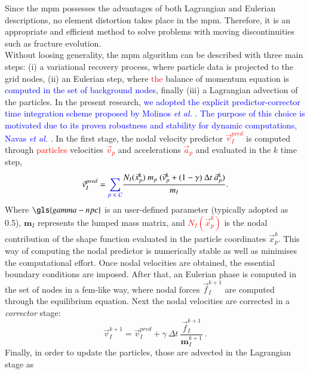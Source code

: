 \documentclass[preprint,12pt,a4paper]{elsarticle}
\newcommand{\tens}[1]{
  \ensuremath{\mathbf{{#1}}}
}
\begin{document}
Since the \acrshort{mpm} possesses the advantages of both Lagrangian and Eulerian descriptions, no  element distortion takes place in the \acrshort{mpm}. Therefore, it is an appropriate and efficient method
to solve problems with moving discontinuities such as fracture evolution.\\
Without loosing generality, the \acrshort{mpm} algorithm
can be described with three main steps: (i) a variational recovery
process, where particle data is projected to the grid nodes, (ii) an
Eulerian step, where \textcolor{red}{the} balance of momentum equation is \textcolor{blue}{computed in the set of background nodes}, finally
(iii) a Lagrangian advection of the particles. In the present research,
\textcolor{blue}{we adopted the explicit predictor-corrector time integration scheme proposed by Molinos {\it et al.} \cite{Molinos2020}. The purpose of this choice is motivated due to its proven robustness and stability for dynamic computations, Navas {\it et al.} \cite{Navas2018a}}. In the first stage, the nodal velocity predictor \textcolor{red}{$ \vec{v}_{I}^{pred}$} is computed through
\textcolor{red}{particles} velocities \textcolor{red}{$\vec{v}_p$} and accelerations \textcolor{red}{$\vec{a}_p$} and evaluated
in the $k$ time step,
\begin{equation}
 \label{eq:Predictor-velocity}
    \vec{v}_{I}^{pred} =  \textcolor{blue}{\sum_{p\ \in\ \mathcal{C}}} \frac{ N_{I}(\vec{x}_p^k )\ m_p\ (\vec{v}_p^k + (1 - \gamma)\ \Delta t\ \vec{a}_p^k)}{m_I}.
\end{equation}
Where $\gls{gamma-npc}$ is an user-defined parameter (typically adopted as
0.5), $\tens{m}_I$ represents the lumped mass matrix, and \textcolor{red}{$N_{I}(\vec{x}_p^k) $} is the nodal contribution of the shape function evaluated in the particle
coordinates $\vec{x}_p^k$. This way of computing the nodal predictor is numerically stable
as well as minimises the computational effort. Once nodal velocities are
obtained, the essential boundary conditions are imposed. After that, an
Eulerian phase is computed in the set of nodes in a
\acrshort{fem}-like way, where nodal forces $\vec{f}_{I}^{k+1}$ are
computed through the equilibrium equation. Next the nodal velocities
are corrected in a \textit{corrector} stage:
\begin{equation}
  \label{eq:Corrector-velocity}
  \vec{v}_{I}^{k+1} = \vec{v}_{I}^{pred} + \gamma\ \Delta t\
  \frac{\vec{f}_{I}^{k+1}}{\tens{m}_I^{k+1}}\ .
\end{equation}
Finally, in order to update the particles, those are advected in the Lagrangian stage as
\end{document}
